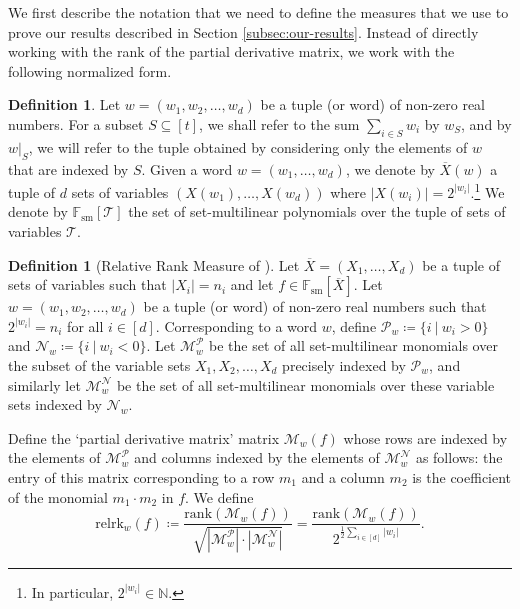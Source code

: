 \documentclass[10pt,a4paper]{article}
\theoremstyle{definition}%
\newtheorem{definition}[theorem]{Definition}
\theoremstyle{plain}
\newcommand{\rk}{\mathrm{relrk}}
\newcommand{\Fsm}{\mathbb{F}_{\mathrm{sm}}}
\newcommand{\ol}[1]{\overline{#1}}
\newcommand{\calM}{\mathcal{M}}
\newcommand{\calN}{\mathcal{N}}
\newcommand{\calP}{\mathcal{P}}
\newcommand{\calT}{\mathcal{T}}
\begin{document}
We first describe the notation that we need to define the measures that we use to prove our results described in Section \ref{subsec:our-results}. Instead of directly working with the rank of the partial derivative matrix, we work with the following normalized form.

\begin{definition}\label{def:rk-rest}
Let $w = (w_1, w_2,\ldots, w_d)$ be a tuple (or word) of non-zero real numbers. For a subset $S \subseteq [t]$, we shall refer to the sum $\sum_{i\in S} w_i$ by $w_S$,  and by $w|_S$, we will refer to the tuple obtained by considering only the
elements of $w$ that are indexed by $S$. 
Given a word $w=(w_1,\ldots,w_d)$, we denote by $\ol{X}(w)$ a tuple of $d$ sets of variables $(X(w_1),\ldots,X(w_d))$ where
$|X(w_i)| = 2^{|w_i|}$.\footnote{In particular, $2^{|w_i|}\in\mathbb{N}$.}
We denote by $\Fsm[\calT]$ the set of set-multilinear polynomials over the tuple
of sets of variables $\calT$.
\end{definition}


\begin{definition}[Relative Rank Measure of \cite{LST1}]\label{def:relrk}
Let $\ol{X}=(X_1,\ldots,X_d)$ be a tuple of sets of variables such that $|X_i|=n_i$ and let $f\in \Fsm[\ol{X}]$.
 Let $w = (w_1, w_2,\ldots, w_d)$ be a tuple (or word) of non-zero real numbers such that $2^{|w_i|}  = n_i $ for all $i \in [d]$. Corresponding to a word $w$, define $\calP_w \coloneqq \{i\ |\ w_i > 0\}$ and $\calN_w \coloneqq \{i\ |\ w_i < 0\}$. Let $\calM^{\calP}_{w}$ be the
set of all set-multilinear monomials over the subset of the variable sets $X_1, X_2,\ldots, X_d$ precisely
indexed by $\calP_w$, and similarly let $\calM^{\calN}_{w}$ be the set of all set-multilinear monomials over these variable
sets indexed by $\calN_w$.

Define the ‘partial derivative matrix’ matrix $\calM_w(f)$ whose rows are indexed by the elements
of $\calM^{\calP}_w$ and columns indexed by the elements of $\calM^{\calN}_{w}$ as follows: the entry of this matrix corresponding to a
row $m_1$ and a column $m_2$ is the coefficient of the monomial $m_1\cdot m_2$ in $f$. We define
\[
\rk_w(f) \coloneqq \frac{\mathrm{rank}(\calM_w(f))}{\sqrt{|\calM^{\calP}_w|\cdot |\calM^{\calN}_w|}} = \frac{\mathrm{rank}(\calM_w(f))}{2^{\frac{1}{2}\sum_{i\in[d]}|w_i|}}.
\]
\end{definition}
\end{document}
